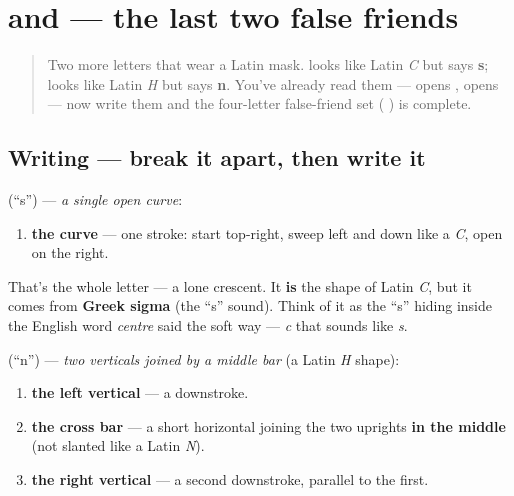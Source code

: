 \section[\texorpdfstring{\ru{с}, \ru{н} (s, n)}{с, н (s, n)}]{ and  — the last two false friends}

\label{lesson:RU-W02-false-friends-s-n}



\begin{quote}
Two more letters that wear a Latin mask. \textbf{} looks like Latin \emph{C} but says \textbf{s}; \textbf{} looks like Latin \emph{H} but says \textbf{n}. You've already read them — \emph{} opens \emph{}, \emph{} opens \emph{} — now write them and the four-letter false-friend set (   ) is complete.
\end{quote}

\subsection*{Writing — break it apart, then write it}

\textbf{} (\textquotedblleft{}s\textquotedblright{}) — \emph{a single open curve}:

\begin{enumerate}
\raggedright
  \item \textbf{the curve} — one stroke: start top-right, sweep left and down like a \emph{C}, open on the right.
\end{enumerate}

That's the whole letter — a lone crescent. It \textbf{is} the shape of Latin \emph{C}, but it comes from \textbf{Greek sigma} (the \textquotedblleft{}s\textquotedblright{} sound). Think of it as the \textquotedblleft{}s\textquotedblright{} hiding inside the English word \emph{centre} said the soft way — \emph{c} that sounds like \emph{s}.

\textbf{} (\textquotedblleft{}n\textquotedblright{}) — \emph{two verticals joined by a middle bar} (a Latin \emph{H} shape):

\begin{enumerate}
\raggedright
  \item \textbf{the left vertical} — a downstroke.
  \item \textbf{the cross bar} — a short horizontal joining the two uprights \textbf{in the middle} (not slanted like a Latin \emph{N}).
  \item \textbf{the right vertical} — a second downstroke, parallel to the first.
\end{enumerate}

